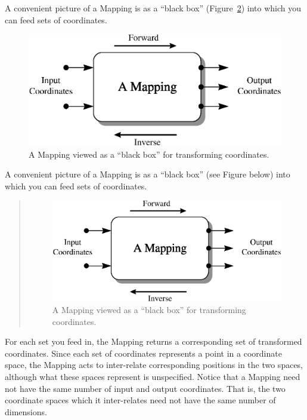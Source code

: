 \documentclass[twoside,11pt]{article}
\newenvironment{latexonly}{}{}
\begin{document}
\begin{latexonly}
   A convenient picture of a Mapping is as a ``black box''
   (Figure~\ref{fig:mapping}) into which you can feed sets of
   coordinates.
   \begin{figure}[bhtp]
   \begin{center}
   \includegraphics[scale=0.7]{sun210_figures/mapping.eps}
   \caption{A Mapping viewed as a ``black box'' for transforming coordinates.}
   \label{fig:mapping}
   \end{center}
   \end{figure}
\end{latexonly}
\begin{htmlonly}
   A convenient picture of a Mapping is as a ``black box'' (see Figure
   below) into which you can feed sets of coordinates.
   \begin{quote}
   \begin{figure}[bhtp]
   \label{fig:mapping}
   \includegraphics[scale=1.2]{sun210_figures/mapping.eps}
   \caption{A Mapping viewed as a ``black box'' for transforming coordinates.}
   \end{figure}
   \end{quote}
\end{htmlonly}
For each set you feed in, the Mapping returns a corresponding set of
transformed coordinates. Since each set of coordinates represents a
point in a coordinate space, the Mapping acts to inter-relate
corresponding positions in the two spaces, although what these spaces
represent is unspecified.  Notice that a Mapping need not have the
same number of input and output coordinates. That is, the two
coordinate spaces which it inter-relates need not have the same number
of dimensions.
\end{document}
